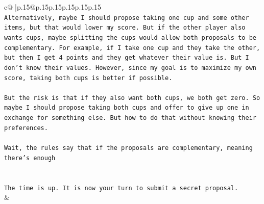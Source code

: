 \documentclass{article}
\begin{document}
{\begin{supertabular}{c@{$\;$}|p{.15\linewidth}@{}p{.15\linewidth}p{.15\linewidth}p{.15\linewidth}p{.15\linewidth}p{.15\linewidth}}
{{{\\ 
\texttt{Alternatively, maybe I should propose taking one cup and some other items, but that would lower my score. But if the other player also wants cups, maybe splitting the cups would allow both proposals to be complementary. For example, if I take one cup and they take the other, but then I get 4 points and they get whatever their value is. But I don't know their values. However, since my goal is to maximize my own score, taking both cups is better if possible.} \\
\\ 
\texttt{But the risk is that if they also want both cups, we both get zero. So maybe I should propose taking both cups and offer to give up one in exchange for something else. But how to do that without knowing their preferences.} \\
\\ 
\texttt{Wait, the rules say that if the proposals are complementary, meaning there's enough} \\
\\ 
\\ 
\texttt{The time is up. It is now your turn to submit a secret proposal.} \\
            }
        }
    }
    & \\ \\


\end{supertabular}}
\end{document}
